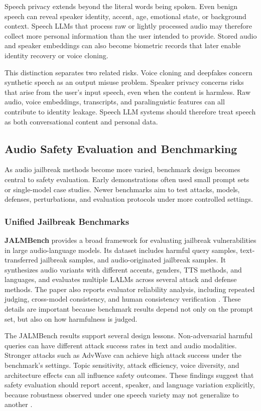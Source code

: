 Speech privacy extends beyond the literal words being spoken. Even benign speech can reveal speaker identity, accent, age, emotional state, or background context. Speech LLMs that process raw or lightly processed audio may therefore collect more personal information than the user intended to provide. Stored audio and speaker embeddings can also become biometric records that later enable identity recovery or voice cloning.

This distinction separates two related risks. Voice cloning and deepfakes concern synthetic speech as an output misuse problem. Speaker privacy concerns risks that arise from the user's input speech, even when the content is harmless. Raw audio, voice embeddings, transcripts, and paralinguistic features can all contribute to identity leakage. Speech LLM systems should therefore treat speech as both conversational content and personal data.

\subsection{Audio Safety Evaluation and Benchmarking}

As audio jailbreak methods become more varied, benchmark design becomes central to safety evaluation. Early demonstrations often used small prompt sets or single-model case studies. Newer benchmarks aim to test attacks, models, defenses, perturbations, and evaluation protocols under more controlled settings.

\subsubsection{Unified Jailbreak Benchmarks}

\textbf{JALMBench} provides a broad framework for evaluating jailbreak vulnerabilities in large audio-language models. Its dataset includes harmful query samples, text-transferred jailbreak samples, and audio-originated jailbreak samples. It synthesizes audio variants with different accents, genders, TTS methods, and languages, and evaluates multiple LALMs across several attack and defense methods. The paper also reports evaluator reliability analysis, including repeated judging, cross-model consistency, and human consistency verification \citep{peng2026jalmbenchbenchmarkingjailbreakvulnerabilities}. These details are important because benchmark results depend not only on the prompt set, but also on how harmfulness is judged.

The JALMBench results support several design lessons. Non-adversarial harmful queries can have different attack success rates in text and audio modalities. Stronger attacks such as AdvWave can achieve high attack success under the benchmark's settings. Topic sensitivity, attack efficiency, voice diversity, and architecture effects can all influence safety outcomes. These findings suggest that safety evaluation should report accent, speaker, and language variation explicitly, because robustness observed under one speech variety may not generalize to another \citep{peng2026jalmbenchbenchmarkingjailbreakvulnerabilities}.

